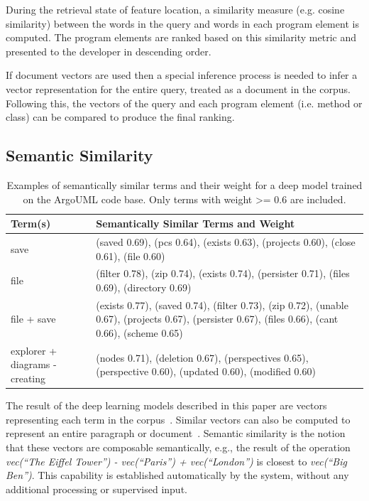 During the retrieval state of feature location, a similarity measure (e.g.
cosine similarity) between the words in the query and words in each program
element is computed. The program elements are ranked based on this similarity
metric and presented to the developer in descending order.

If document vectors are used then a special inference process is needed to infer
a vector representation for the entire query, treated as a document in the
corpus. Following this, the vectors of the query and each program element (i.e.
method or class) can be compared to produce the final ranking.

\subsection{Semantic Similarity}


\begin{table}[t]
\vspace{2mm}
\centering
\caption{Examples of semantically similar terms and their weight for a deep model trained on
the ArgoUML code base. Only terms with weight >= 0.6 are included.}
\label{tab:semsim}
\begin{tabular}{p{}p{}}
\toprule
Term(s) & Semantically Similar Terms and Weight\\ 
\midrule
save & (saved 0.69), (pcs 0.64), (exists 0.63), (projects 0.60), (close 0.61), (file 0.60) \\ \hline
file & (filter 0.78), (zip 0.74), (exists 0.74), (persister 0.71), (files 0.69), (directory 0.69) \\ \hline
file + save & (exists 0.77), (saved 0.74), (filter 0.73), (zip 0.72), (unable 0.67), (projects 0.67), (persister 0.67), (files 0.66), (cant 0.66), (scheme 0.65) \\ \hline
explorer + diagrams - creating & (nodes 0.71), (deletion 0.67), (perspectives 0.65), (perspective 0.60), (updated 0.60), (modified 0.60)\\
\bottomrule
\end{tabular}
\end{table}

The result of the deep learning models described in this paper are vectors
representing each term in the corpus~\cite{mikolov_distributed_2013}. Similar
vectors can also be computed to represent an entire paragraph or
document~\cite{le_distributed_2014}. Semantic similarity is the notion that
these vectors are composable semantically, e.g., the result of the operation
{\em vec(``The Eiffel Tower'') - vec(``Paris'') + vec(``London'')} is closest to
{\em vec(``Big Ben'')}. This capability is established automatically by the
system, without any additional processing or supervised input.

